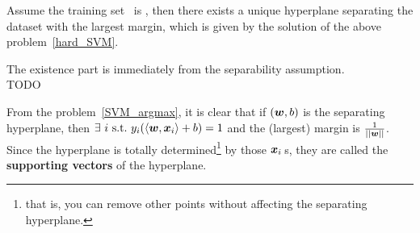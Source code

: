 \begin{thm}
    Assume the training set \dataset\ is , then there exists a unique hyperplane 
    separating the dataset with the largest margin, which is given by the solution of the above 
    problem~\eqref{hard_SVM}.
\end{thm}
\begin{pf}
    The existence part is immediately from the separability assumption.\\
    TODO
\end{pf}

\begin{re}
    From the problem~\eqref{SVM_argmax}, it is clear that if $(\boldsymbol{w}, b)$ is the separating hyperplane, then
    $\exists~i\ \text{s.t.\ } y_i(\langle\boldsymbol{w}, \boldsymbol{x}_i\rangle + b) = 1$ and the (largest) margin is $\frac{1}{||\boldsymbol{w}||}$.
    Since the hyperplane is totally determined\footnote{that is, you can remove other points without affecting
    the separating hyperplane.} by those $\boldsymbol{x}_i$\,s, they are called the \textbf{supporting vectors} of the
    hyperplane.
\end{re}

